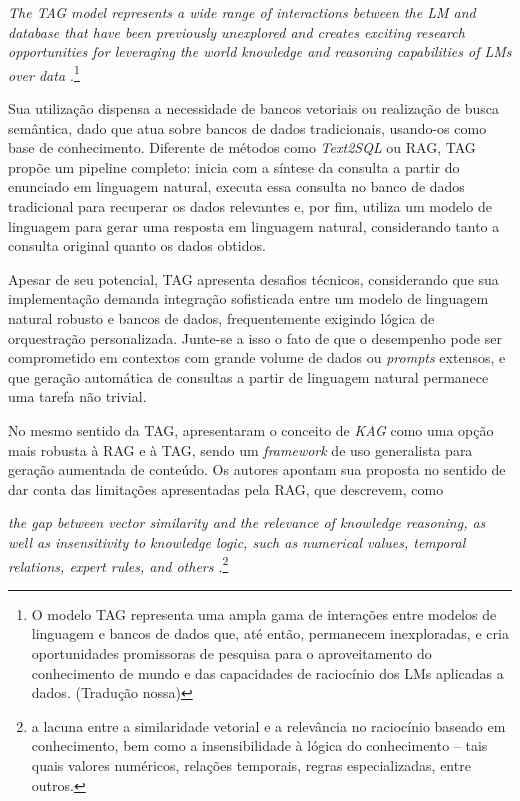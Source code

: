 \begin{citacao}
    \textit{The TAG model represents a wide range of interactions between the LM and database that have been previously unexplored and creates exciting research opportunities for leveraging the world knowledge and reasoning capabilities of LMs over data \cite{TAG:1}}.\footnote{O modelo TAG representa uma ampla gama de interações entre modelos de linguagem e bancos de dados que, até então, permanecem inexploradas, e cria oportunidades promissoras de pesquisa para o aproveitamento do conhecimento de mundo e das capacidades de raciocínio dos LMs aplicadas a dados. (Tradução nossa)}
\end{citacao}

Sua utilização dispensa a necessidade de bancos vetoriais ou realização de busca semântica, dado que atua sobre bancos de dados tradicionais, usando-os como base de conhecimento. Diferente de métodos como \textit{Text2SQL} ou \ac{RAG}, \ac{TAG} propõe um pipeline completo: inicia com a síntese da consulta a partir do enunciado em linguagem natural, executa essa consulta no banco de dados tradicional para recuperar os dados relevantes e, por fim, utiliza um modelo de linguagem para gerar uma resposta em linguagem natural, considerando tanto a consulta original quanto os dados obtidos.

Apesar de seu potencial, \ac{TAG} apresenta desafios técnicos, considerando que sua implementação demanda integração sofisticada entre um modelo de linguagem natural robusto e bancos de dados, frequentemente exigindo lógica de orquestração personalizada. Junte-se a isso o fato de que o desempenho pode ser comprometido em contextos com grande volume de dados ou \textit{prompts} extensos, e que geração automática de consultas a partir de linguagem natural permanece uma tarefa não trivial.

No mesmo sentido da \ac{TAG},  apresentaram o conceito de \textit{\ac{KAG}} como uma opção mais robusta à \ac{RAG} e à \ac{TAG}, sendo um \textit{framework} de uso generalista para geração aumentada de conteúdo. Os autores apontam sua proposta no sentido de dar conta das limitações apresentadas pela \ac{RAG}, que descrevem, como

\begin{citacao}
    \textit{the gap between vector similarity and the relevance of knowledge reasoning, as well as insensitivity to knowledge logic, such as numerical values, temporal relations, expert rules, and others \cite{KAG:1}}.\footnote{a lacuna entre a similaridade vetorial e a relevância no raciocínio baseado em conhecimento, bem como a insensibilidade à lógica do conhecimento -- tais quais valores numéricos, relações temporais, regras especializadas, entre outros.}
\end{citacao}

